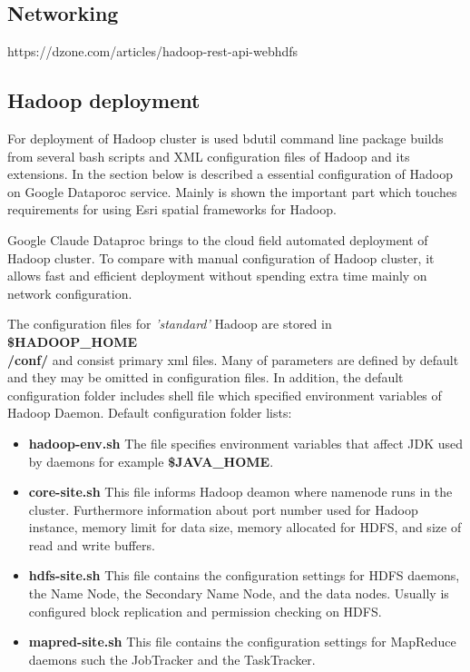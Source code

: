\documentclass[a4paper,12pt,oneside]{report}
\begin{document}
\subsection{Networking}
https://dzone.com/articles/hadoop-rest-api-webhdfs



        \subsection{Hadoop deployment}
        
For deployment of Hadoop cluster is used bdutil command line package builds from several bash scripts 
and XML configuration files of Hadoop and its extensions. In the section below is described a essential 
configuration of Hadoop on Google Dataporoc 
service. Mainly is shown the important part which touches requirements for using Esri spatial frameworks for Hadoop. 

Google Claude Dataproc brings to the cloud field automated deployment of Hadoop cluster. To compare 
with manual configuration of Hadoop cluster, it allows fast and efficient deployment without spending 
extra time mainly on network configuration.

The configuration files for \textit{'standard'} Hadoop are stored in \textbf{\$HADOOP\_HOME\\/conf/} 
and consist  primary xml files. Many of parameters are defined by default and they may be omitted in configuration files. In addition, the default 
configuration folder  includes shell file which specified environment variables of Hadoop Daemon. Default configuration folder lists:
\begin{itemize}
\item \textbf{hadoop-env.sh} The file specifies environment variables that affect JDK used by daemons
for example \textbf{\$JAVA\_HOME}.
\item \textbf{core-site.sh}   This file informs Hadoop deamon where namenode runs in the cluster. Furthermore 
information about port number used for Hadoop instance, memory limit for data size,  memory allocated for HDFS, and size of read and write buffers.
\item \textbf{hdfs-site.sh}  This file contains the configuration settings for HDFS daemons, the Name 
Node, the Secondary Name Node, and the data nodes. Usually is configured block replication and permission checking on HDFS. 
\item \textbf{mapred-site.sh}  This file contains the configuration settings for MapReduce daemons 
such the JobTracker and the TaskTracker.
\end{itemize}
\end{document}
